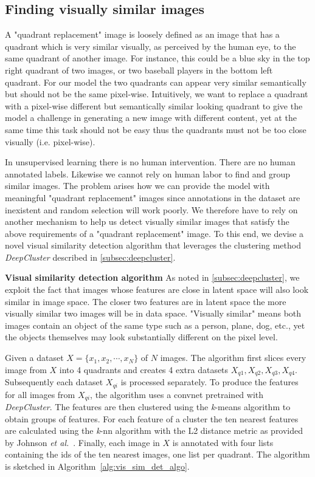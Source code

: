 \documentclass[12pt,a4paper]{article}
\begin{document}
\subsection{Finding visually similar images} \label{subsec:img_clustering}
A "quadrant replacement" image is loosely defined as an image that has a quadrant which is very similar visually, as perceived by the human eye, to the same quadrant of another image. For instance, this could be a blue sky in the top right quadrant of two images, or two baseball players in the bottom left quadrant. For our model the two quadrants can appear very similar semantically but should not be the same pixel-wise. Intuitively, we want to replace a quadrant with a pixel-wise different but semantically similar looking quadrant to give the model a challenge in generating a new image with different content, yet at the same time this task should not be easy thus the quadrants must not be too close visually (i.e. pixel-wise).

In unsupervised learning there is no human intervention. There are no human annotated labels. Likewise we cannot rely on human labor to find and group similar images. The problem arises how we can provide the model with meaningful "quadrant replacement" images since annotations in the dataset are inexistent and random selection will work poorly. We therefore have to rely on another mechanism to help us detect visually similar images that satisfy the above requirements of a "quadrant replacement" image. To this end, we devise a novel visual similarity detection algorithm that leverages the clustering method \textit{DeepCluster} described in \ref{subsec:deepcluster}.

\textbf{Visual similarity detection algorithm} As noted in \ref{subsec:deepcluster}, we exploit the fact that images whose features are close in latent space will also look similar in image space. The closer two features are in latent space the more visually similar two images will be in data space. "Visually similar" means both images contain an object of the same type such as a person, plane, dog, etc., yet the objects themselves may look substantially different on the pixel level.

Given a dataset $X = \{x_1,x_2,\cdots,x_N\}$ of $N$ images. The algorithm first slices every image from $X$ into 4 quadrants and creates 4 extra datasets $X_{q1}, X_{q2}, X_{q3}, X_{q4}$. Subsequently each dataset $X_{qi}$ is processed separately. To produce the features for all images from $X_{qi}$, the algorithm uses a convnet pretrained with \textit{DeepCluster}. The features are then clustered using the \textit{k}-means algorithm to obtain groups of features. For each feature of a cluster the ten nearest features are calculated using the \textit{k}-nn algorithm with the L2 distance metric as provided by Johnson \textit{et al.}~\cite{FaissKnn}. Finally, each image in $X$ is annotated with four lists containing the ids of the ten nearest images, one list per quadrant. The algorithm is sketched in Algorithm~\ref{alg:vis_sim_det_algo}.
\end{document}
